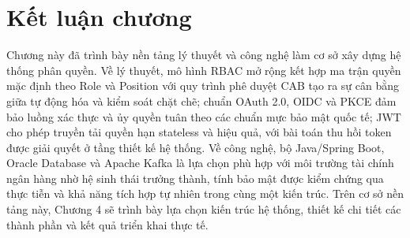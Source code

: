 \documentclass[../DoAn.tex]{subfiles}
\begin{document}
\section{Kết luận chương}
\label{section:3.3}

Chương này đã trình bày nền tảng lý thuyết và công nghệ làm cơ sở xây dựng hệ thống phân quyền. Về lý thuyết, mô hình RBAC mở rộng kết hợp ma trận quyền mặc định theo Role và Position với quy trình phê duyệt CAB tạo ra sự cân bằng giữa tự động hóa và kiểm soát chặt chẽ; chuẩn OAuth 2.0, OIDC và PKCE đảm bảo luồng xác thực và ủy quyền tuân theo các chuẩn mực bảo mật quốc tế; JWT cho phép truyền tải quyền hạn stateless và hiệu quả, với bài toán thu hồi token được giải quyết ở tầng thiết kế hệ thống. Về công nghệ, bộ Java/Spring Boot, Oracle Database và Apache Kafka là lựa chọn phù hợp với môi trường tài chính ngân hàng nhờ hệ sinh thái trưởng thành, tính bảo mật được kiểm chứng qua thực tiễn và khả năng tích hợp tự nhiên trong cùng một kiến trúc. Trên cơ sở nền tảng này, Chương 4 sẽ trình bày lựa chọn kiến trúc hệ thống, thiết kế chi tiết các thành phần và kết quả triển khai thực tế.
\end{document}
